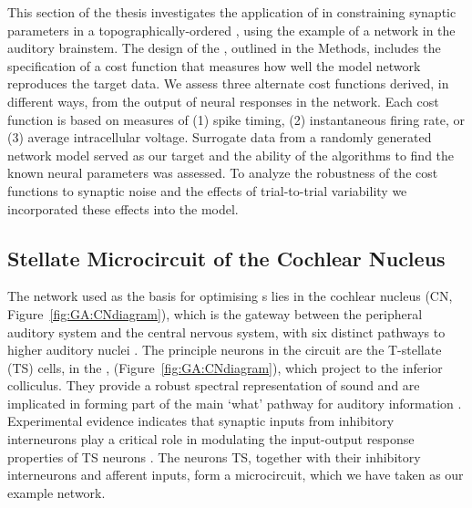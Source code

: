 \smallskip{} 

This section of the thesis investigates the application of {\GAs} in
constraining synaptic parameters in a topographically-ordered {\BNN},
using the example of a network in the auditory brainstem. The design
of the {\GA}, outlined in the Methods, includes the specification of a
cost function that measures how well the model network reproduces the
target data. We assess three alternate cost functions derived, in
different ways, from the output of neural responses in the
network. Each cost function is based on measures of (1) spike timing,
(2) instantaneous firing rate, or (3) average intracellular
voltage. Surrogate data from a randomly generated network model served
as our target and the ability of the algorithms to find the known
neural parameters was assessed. To analyze the robustness of the cost
functions to synaptic noise and the effects of trial-to-trial
variability we incorporated these effects into the model.

\subsection{Stellate Microcircuit of the Cochlear
  Nucleus}\label{sec:GA:stell-micr-cochl}

The network used as the basis for optimising {\BNN}s lies in the cochlear
nucleus (CN, Figure~\ref{fig:GA:CNdiagram}), which is the gateway
between the peripheral auditory system and the central nervous system,
with six distinct pathways to higher auditory nuclei
\citep{CantBenson:2003}. The principle neurons in the circuit are the
T-stellate (TS) cells, in the \VCN,
(Figure~\ref{fig:GA:CNdiagram}), which project to the inferior
colliculus.  They provide a robust spectral representation of sound
and are implicated in forming part of the main `what' pathway for
auditory information \citep{YoungOertel:2004}. Experimental evidence
indicates that synaptic inputs from inhibitory interneurons play a
critical role in modulating the input-output response properties of TS
neurons
\citep{FerragamoGoldingEtAl:1998,NeedhamPaolini:2006,PaoliniClareyEtAl:2005}.
The neurons TS, together with their inhibitory interneurons and
afferent inputs, form a microcircuit, which we have taken as our
example network.



